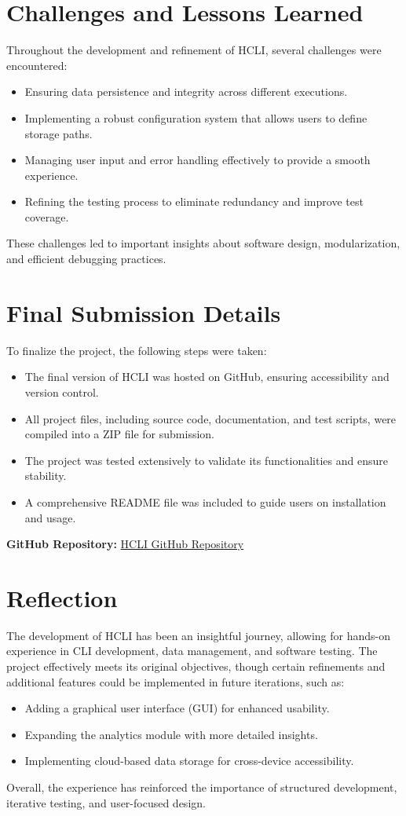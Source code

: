 \documentclass[a4paper,12pt]{article}
\begin{document}
\section{Challenges and Lessons Learned}
Throughout the development and refinement of HCLI, several challenges were encountered:
\begin{itemize}
    \item Ensuring data persistence and integrity across different executions.
    \item Implementing a robust configuration system that allows users to define storage paths.
    \item Managing user input and error handling effectively to provide a smooth experience.
    \item Refining the testing process to eliminate redundancy and improve test coverage.
\end{itemize}
These challenges led to important insights about software design, modularization, and efficient debugging practices.

\section{Final Submission Details}
To finalize the project, the following steps were taken:
\begin{itemize}
    \item The final version of HCLI was hosted on GitHub, ensuring accessibility and version control.
    \item All project files, including source code, documentation, and test scripts, were compiled into a ZIP file for submission.
    \item The project was tested extensively to validate its functionalities and ensure stability.
    \item A comprehensive README file was included to guide users on installation and usage.
\end{itemize}

\noindent \textbf{GitHub Repository:} \href{https://github.com/alemxral/HCLI}{HCLI GitHub Repository}

\section{Reflection}
The development of HCLI has been an insightful journey, allowing for hands-on experience in CLI development, data management, and software testing. The project effectively meets its original objectives, though certain refinements and additional features could be implemented in future iterations, such as:
\begin{itemize}
    \item Adding a graphical user interface (GUI) for enhanced usability.
    \item Expanding the analytics module with more detailed insights.
    \item Implementing cloud-based data storage for cross-device accessibility.
\end{itemize}
Overall, the experience has reinforced the importance of structured development, iterative testing, and user-focused design.
\end{document}
